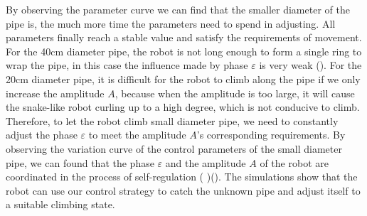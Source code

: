 By observing the parameter curve we can find that the smaller diameter of the pipe is, the much more time the parameters need to spend in adjusting. All parameters finally reach a stable value and satisfy the requirements of movement. For the 40cm diameter pipe, the robot is not long enough to form a single ring to wrap the pipe, in this case the influence made by phase $\varepsilon$ is very weak (). For the 20cm diameter pipe, it is difficult for the robot to climb along the pipe if we only increase the amplitude $A$, because when the amplitude is too large, it will cause the snake-like robot curling up to a high degree, which is not conducive to climb. Therefore, to let the robot climb small diameter pipe, we need to constantly adjust the phase $\varepsilon$ to meet the amplitude $A$'s corresponding requirements. By observing the variation curve of the control parameters of the small diameter pipe, we can found that the phase $\varepsilon$ and the amplitude $A$ of the robot are coordinated in the process of self-regulation ( )(). The simulations show that the robot can use our control strategy to catch the unknown pipe and adjust itself to a suitable climbing state.

